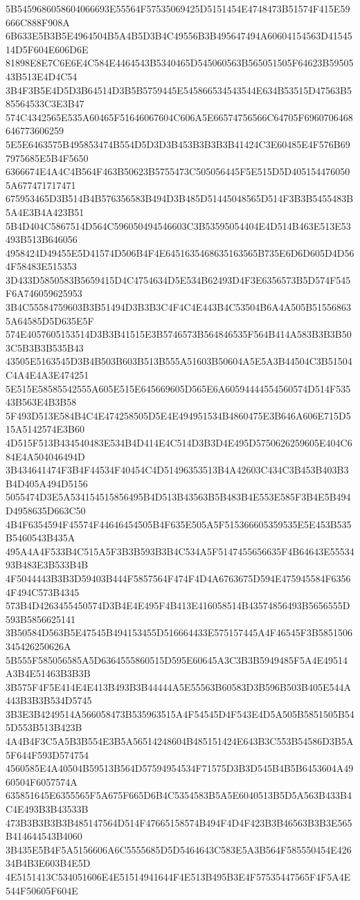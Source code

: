 {{{{{{{{{{{{{{{{{{{{{5B5459686058604066693E55564F57535069425D5151454E4748473B51574F415E59666C888F908A
6B633E5B3B5E4964504B5A4B5D3B4C49556B3B495647494A60604154563D4154514D5F604E606D6E
81898E8E7C6E6E4C584E4464543B5340465D545060563B565051505F64623B5950543B513E4D4C54
3B4F3B5E4D5D3B64514D3B5B5759445E545866534543544E634B53515D47563B585564533C3E3B47
574C4342565E535A60465F51646067604C606A5E66574756566C64705F6960706468646773606259
5E5E6463575B495853474B554D5D3D3B453B3B3B3B41424C3E60485E4F576B697975685E5B4F5650
6366674E4A4C4B564F463B50623B5755473C505056445F5E515D5D4051544760505A677471717471
675953465D3B514B4B576356583B494D3B485D51445048565D514F3B3B5455483B5A4E3B4A423B51
5B4D404C5867514D564C596050494546603C3B53595054404E4D514B463E513E53493B513B646056
4958424D49455E5D41574D506B4F4E6451635468635163565B735E6D6D605D4D564F58483E515353
3D433D5850583B5659415D4C4754634D5E534B62493D4F3E6356573B5D574F545F6A746059625953
3B4C55584759603B3B51494D3B3B3C4F4C4E443B4C53504B6A4A505B515568635A64585D5D635E5F
574E4057605153514D3B3B41515E3B5746573B564846535F564B414A583B3B3B503C5B3B3B535B43
43505E5163545D3B4B503B603B513B555A51603B50604A5E5A3B44504C3B51504C4A4E4A3E474251
5E515E58585542555A605E515E645669605D565E6A60594444554560574D514F53543B563E4B3B58
5F493D513E584B4C4E474258505D5E4E494951534B4860475E3B646A606E715D515A5142574E3B60
4D515F513B434540483E534B4D414E4C514D3B3D4E495D5750626259605E404C684E4A504046494D
3B434641474F3B4F44534F40454C4D51496353513B4A42603C434C3B453B403B3B4D405A494D5156
5055474D3E5A534154515856495B4D513B43563B5B483B4E553E585F3B4E5B494D4958635D663C50
4B4F6354594F45574F44646454505B4F635E505A5F515366605359535E5E453B535B5460543B435A
495A4A4F533B4C515A5F3B3B593B3B4C534A5F5147455656635F4B64643E5553493B483E3B533B4B
4F5044443B3B3D59403B444F5857564F474F4D4A6763675D594E475945584F63564F494C573B4345
573B4D4263455450574D3B4E4E495F4B413E416058514B43574856493B5656555D593B5856625141
3B50584D563B5E47545B494153455D516664433E575157445A4F46545F3B5851506345426250626A
5B555F585056585A5D6364555860515D595E60645A3C3B3B5949485F5A4E49514A3B4E51463B3B3B
3B575F4F5E414E4E413B493B3B44444A5E55563B60583D3B596B503B405E544A443B3B3B534D5745
3B3E3B4249514A566058473B535963515A4F54545D4F543E4D5A505B5851505B545D553B513B423B
4A4B4F3C5A5B3B554E3B5A56514248604B485151424E643B3C553B54586D3B5A5F644F593D574754
4560585E4A40504B59513B564D57594954534F71575D3B3D545B4B5B6453604A4960504F6057574A
635851645E6355565F5A675F665D6B4C5354583B5A5E6040513B5D5A563B433B4C4E493B3B43533B
473B3B3B3B3B485147564D514F47665158574B494F4D4F423B3B46563B3B3E565B414644543B4060
3B435E5B4F5A5156606A6C5555685D5D5464643C583E5A3B564F585550454E42634B4B3E603B4E5D
4E5151413C534051606E4E51514941644F4E513B495B3E4F57535447565F4F5A4E544F50605F604E
}}}}}}}}}}}}}}}}}}}}}
